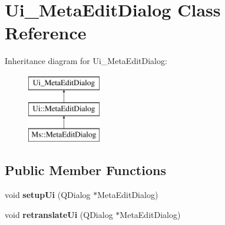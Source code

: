 \hypertarget{class_ui___meta_edit_dialog}{}\section{Ui\+\_\+\+Meta\+Edit\+Dialog Class Reference}
\label{class_ui___meta_edit_dialog}
Inheritance diagram for Ui\+\_\+\+Meta\+Edit\+Dialog\+:\begin{figure}[H]
\begin{center}
\leavevmode
\includegraphics[height=3.000000cm]{class_ui___meta_edit_dialog}
\end{center}
\end{figure}
\subsection*{Public Member Functions}
\begin{DoxyCompactItemize}
\item 
\mbox{\label{class_ui___meta_edit_dialog_a8d124cafa1a6878c2bbb75ece03da4e2}} 
void {\bfseries setup\+Ui} (Q\+Dialog $\ast$Meta\+Edit\+Dialog)
\item 
\mbox{\label{class_ui___meta_edit_dialog_a2a69a89ed693112a2725663744544496}} 
void {\bfseries retranslate\+Ui} (Q\+Dialog $\ast$Meta\+Edit\+Dialog)
\end{DoxyCompactItemize}
